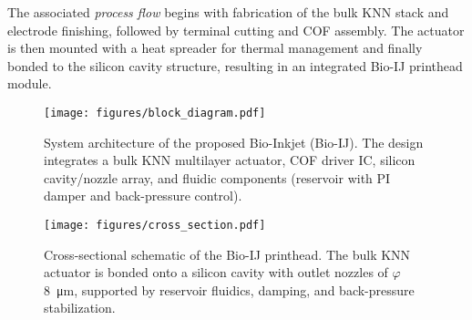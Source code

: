 The associated \textit{process flow} begins with fabrication of the bulk
KNN stack and electrode finishing, followed by terminal cutting and COF
assembly. The actuator is then mounted with a heat spreader for thermal
management and finally bonded to the silicon cavity structure,
resulting in an integrated Bio-IJ printhead module.

\begin{figure}[t]
  \centering
  \texttt{[image: figures/block\_diagram.pdf]}
  \caption{System architecture of the proposed Bio-Inkjet (Bio-IJ).
  The design integrates a bulk KNN multilayer actuator, COF driver IC,
  silicon cavity/nozzle array, and fluidic components (reservoir with
  PI damper and back-pressure control).}
  \label{fig:block}
\end{figure}

\begin{figure}[t]
  \centering
  \texttt{[image: figures/cross\_section.pdf]}
  \caption{Cross-sectional schematic of the Bio-IJ printhead.
  The bulk KNN actuator is bonded onto a silicon cavity with outlet
  nozzles of $\varphi$\SI{8}{\micro\meter}, supported by reservoir
  fluidics, damping, and back-pressure stabilization.}
  \label{fig:section}
\end{figure}
